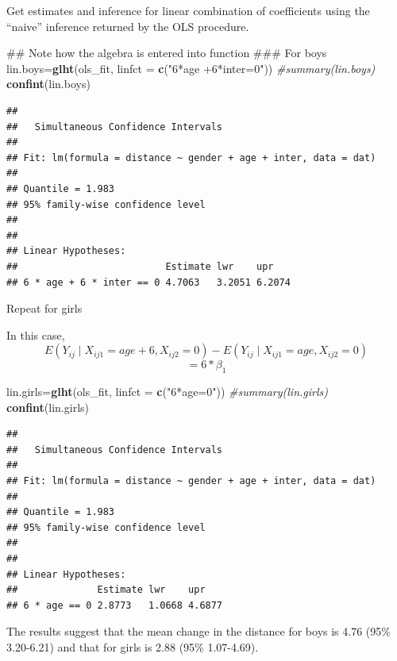 \documentclass[ignorenonframetext,]{beamer}
\newenvironment{Shaded}{\begin{snugshade}}{\end{snugshade}}
\newcommand{\KeywordTok}[1]{\textcolor[rgb]{0.13,0.29,0.53}{\textbf{#1}}}
\newcommand{\DataTypeTok}[1]{\textcolor[rgb]{0.13,0.29,0.53}{#1}}
\newcommand{\StringTok}[1]{\textcolor[rgb]{0.31,0.60,0.02}{#1}}
\newcommand{\CommentTok}[1]{\textcolor[rgb]{0.56,0.35,0.01}{\textit{#1}}}
\newcommand{\NormalTok}[1]{#1}
\begin{document}
\begin{frame}[fragile]{Get estimates and inference for linear
combination of coefficients using the ``naive'' inference returned by
the OLS procedure.}

\tiny

\begin{Shaded}
\begin{Highlighting}[]
\NormalTok{## Note how the algebra is entered into function}
\NormalTok{### For boys}
\NormalTok{lin.boys=}\KeywordTok{glht}\NormalTok{(ols_fit, }\DataTypeTok{linfct =} \KeywordTok{c}\NormalTok{(}\StringTok{"6*age +6*inter=0"}\NormalTok{))}
\CommentTok{#summary(lin.boys)}
\KeywordTok{confint}\NormalTok{(lin.boys)  }
\end{Highlighting}
\end{Shaded}

\begin{verbatim}
## 
##   Simultaneous Confidence Intervals
## 
## Fit: lm(formula = distance ~ gender + age + inter, data = dat)
## 
## Quantile = 1.983
## 95% family-wise confidence level
##  
## 
## Linear Hypotheses:
##                          Estimate lwr    upr   
## 6 * age + 6 * inter == 0 4.7063   3.2051 6.2074
\end{verbatim}

\end{frame}

\begin{frame}[fragile]{Repeat for girls}

In this case,
\[ E(Y_{ij} \mid X_{ij1}=age+6,X_{ij2}=0) -  E(Y_{ij} \mid X_{ij1}=age,X_{ij2}=0) \]
\[ =  6*\beta_1\]

\tiny

\begin{Shaded}
\begin{Highlighting}[]
\NormalTok{lin.girls=}\KeywordTok{glht}\NormalTok{(ols_fit, }\DataTypeTok{linfct =} \KeywordTok{c}\NormalTok{(}\StringTok{"6*age=0"}\NormalTok{))}
\CommentTok{#summary(lin.girls)}
\KeywordTok{confint}\NormalTok{(lin.girls)  }
\end{Highlighting}
\end{Shaded}

\begin{verbatim}
## 
##   Simultaneous Confidence Intervals
## 
## Fit: lm(formula = distance ~ gender + age + inter, data = dat)
## 
## Quantile = 1.983
## 95% family-wise confidence level
##  
## 
## Linear Hypotheses:
##              Estimate lwr    upr   
## 6 * age == 0 2.8773   1.0668 4.6877
\end{verbatim}

The results suggest that the mean change in the distance for boys is
4.76 (95\% 3.20-6.21) and that for girls is 2.88 (95\% 1.07-4.69).

\end{frame}
\end{document}
